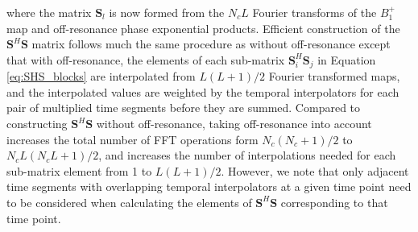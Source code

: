 where the matrix $\bm{S}_l$ is now formed from the $N_c  L$ Fourier transforms of the $B_1^+$ map and off-resonance
phase exponential products.  
Efficient construction of the $\bm{S}^{H}\bm{S}$ matrix follows much the same procedure as without
off-resonance except that with off-resonance,
the elements of each sub-matrix $\bm{S}_i^{H}\bm{S}_j$ in Equation \ref{eq:SHS_blocks}
are interpolated from $L(L+1)/2$ Fourier transformed maps,
and the interpolated values are weighted by the temporal interpolators for each pair of multiplied time segments before they 
are summed.
Compared to constructing $\bm{S}^H\bm{S}$ without off-resonance, 
taking off-resonance into account increases the total number of FFT operations form $N_c(N_c+1)/2$ to $N_cL(N_cL+1)/2$, 
and increases the number of interpolations needed for each sub-matrix element from 1 to $L(L+1)/2$.  
However, we note that only adjacent time segments with overlapping temporal interpolators at a given time point
need to be considered when calculating the elements of $\bm{S}^H\bm{S}$ corresponding to that time point. 



